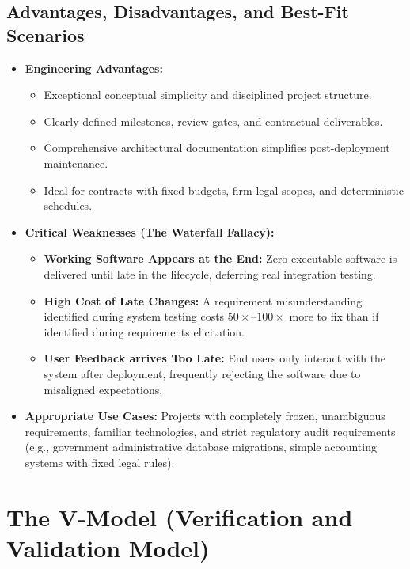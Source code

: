 \subsection{Advantages, Disadvantages, and Best-Fit Scenarios}
\begin{itemize}
    \item \textbf{Engineering Advantages:}
    \begin{itemize}
        \item Exceptional conceptual simplicity and disciplined project structure.
        \item Clearly defined milestones, review gates, and contractual deliverables.
        \item Comprehensive architectural documentation simplifies post-deployment maintenance.
        \item Ideal for contracts with fixed budgets, firm legal scopes, and deterministic schedules.
    \end{itemize}
    \item \textbf{Critical Weaknesses (The Waterfall Fallacy):}
    \begin{itemize}
        \item \textbf{Working Software Appears at the End:} Zero executable software is delivered until late in the lifecycle, deferring real integration testing.
        \item \textbf{High Cost of Late Changes:} A requirement misunderstanding identified during system testing costs $50\times\text{--}100\times$ more to fix than if identified during requirements elicitation.
        \item \textbf{User Feedback arrives Too Late:} End users only interact with the system after deployment, frequently rejecting the software due to misaligned expectations.
    \end{itemize}
    \item \textbf{Appropriate Use Cases:} Projects with completely frozen, unambiguous requirements, familiar technologies, and strict regulatory audit requirements (e.g., government administrative database migrations, simple accounting systems with fixed legal rules).
\end{itemize}

\section{The V-Model (Verification and Validation Model)}
\label{sec:se_v_model}

